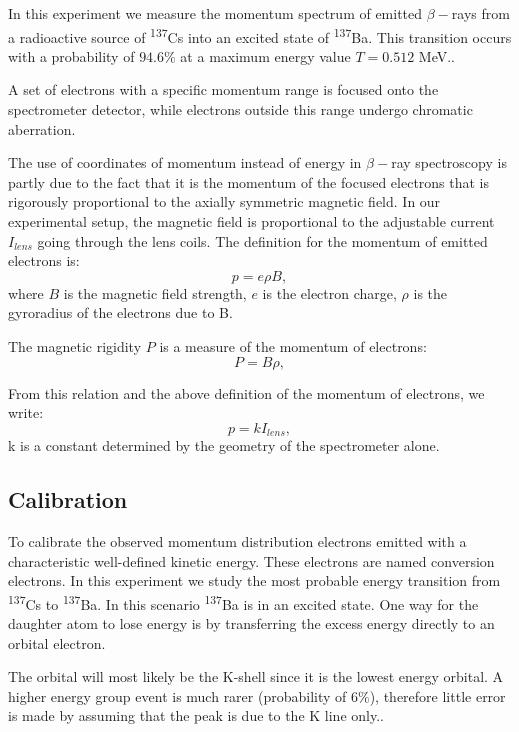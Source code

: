 \documentclass[10pt, a4paper]{article}
\begin{document}
\begin{multicols}{2}
In this experiment we measure the momentum spectrum of emitted $\beta-$rays from a radioactive source of \textsuperscript{137}Cs into an excited state of \textsuperscript{137}Ba. This transition occurs with a probability of $94.6\%$ at a maximum energy value $T = 0.512$ MeV.\cite{SPA}.

A set of electrons with a specific momentum range is focused onto the spectrometer detector, while electrons outside this range undergo chromatic aberration. 

The use of coordinates of momentum instead of energy in $\beta-$ray spectroscopy is partly due to the fact that it is the momentum of the focused electrons that is rigorously proportional to the axially symmetric magnetic field.\cite{QH, Siegbahn} 
In our experimental setup, the magnetic field is proportional to the adjustable current $I_{lens}$ going through the lens coils.
The definition for the momentum of emitted electrons is:
\begin{equation}p = e \rho B,
\end{equation} 
where $B$ is the magnetic field strength, $e$ is the electron charge, $\rho$ is the gyroradius of the electrons due to B.

The magnetic rigidity $P$ is a measure of the momentum of electrons\cite{Wikipedia-Rigidity}:
\begin{equation}P = B \rho,
\end{equation}

From this relation and the above definition of the momentum of electrons, we write:
\begin{equation}p = kI_{lens},
\end{equation}
k is a constant determined by the geometry of the spectrometer alone\cite{QH}.
\subsection{Calibration}
To calibrate the observed momentum distribution electrons emitted with a characteristic well-defined kinetic energy\cite{SPA}.
These electrons are named conversion electrons.
In this experiment we study the most probable energy transition from \textsuperscript{137}Cs to \textsuperscript{137}Ba.
In this scenario \textsuperscript{137}Ba is in an excited state. 
One way for the daughter atom to lose energy is by transferring the excess energy directly to an orbital electron\cite{SPA}.

The orbital will most likely be the K-shell since it is the lowest energy orbital. A higher energy group event is much rarer (probability of $6\%$), therefore little error is made  by assuming that the peak is due to the K line only.\cite{SPA}.


\end{multicols}
\end{document}
